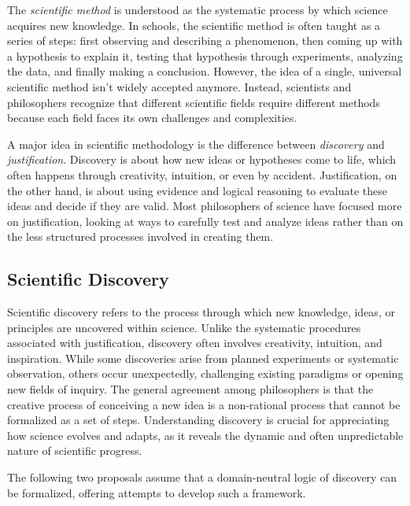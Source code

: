 The \emph{scientific method} is understood as the systematic process by which science acquires new knowledge. In schools, the scientific method is often taught as a series of steps: first observing and describing a phenomenon, then coming up with a hypothesis to explain it, testing that hypothesis through experiments, analyzing the data, and finally making a conclusion. However, the idea of a single, universal scientific method isn’t widely accepted anymore. Instead, scientists and philosophers recognize that different scientific fields require different methods because each field faces its own challenges and complexities.

A major idea in scientific methodology is the difference between \emph{discovery} and \emph{justification}. Discovery is about how new ideas or hypotheses come to life, which often happens through creativity, intuition, or even by accident. Justification, on the other hand, is about using evidence and logical reasoning to evaluate these ideas and decide if they are valid. Most philosophers of science have focused more on justification, looking at ways to carefully test and analyze ideas rather than on the less structured processes involved in creating them.

\subsection{Scientific Discovery}

Scientific discovery refers to the process through which new knowledge, ideas, or principles are uncovered within science. Unlike the systematic procedures associated with justification, discovery often involves creativity, intuition, and inspiration. While some discoveries arise from planned experiments or systematic observation, others occur unexpectedly, challenging existing paradigms or opening new fields of inquiry. The general agreement among philosophers is that the creative process of conceiving a new idea is a non-rational process that cannot be formalized as a set of steps. Understanding discovery is crucial for appreciating how science evolves and adapts, as it reveals the dynamic and often unpredictable nature of scientific progress.

The following two proposals assume that a domain-neutral logic of discovery can be formalized, offering attempts to develop such a framework.


